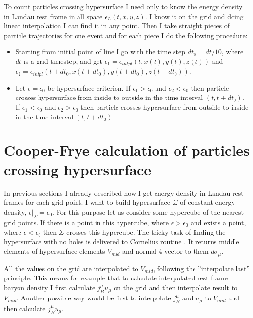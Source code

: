 \documentclass[12pt,a4paper]{report}
\begin{document}
To count particles crossing hypersurface I need only to know the energy density in Landau rest frame in all space $\epsilon_{L}(t,x,y,z)$. I know it on the grid and doing linear interpolation I can find it in any point. Then I take straight pieces of particle trajectories for one event and for each piece I do the following procedure:
\begin{itemize}
\item Starting from initial point of line I go with the time step $dt_0 = dt/10$, where $dt$ is a grid  timestep, and get $\epsilon_1 = \epsilon_{intpl}(t,x(t),y(t),z(t))$ and $\epsilon_2 = \epsilon_{intpl}(t+dt_0,x(t+dt_0),y(t+dt_0),z(t+dt_0))$.
\item Let $\epsilon = \epsilon_0$ be hypersurface criterion. If $\epsilon_1 > \epsilon_0$ and $\epsilon_2 < \epsilon_0$ then particle crosses hypersurface from inside to outside in the time interval $(t,t+dt_0)$. If $\epsilon_1 < \epsilon_0$ and $\epsilon_2 > \epsilon_0$ then particle crosses hypersurface from outside to inside in the time interval $(t,t+dt_0)$.
\end{itemize} 



\section{Cooper-Frye calculation of particles crossing hypersurface}

In previous sections I already described how I get energy density in Landau rest frames for each grid point. I want to build hypersurface $\Sigma$ of constant energy density, $\epsilon|_{\Sigma} = \epsilon_0$. For this purpose let us consider some hypercube of the nearest grid points. If there is a point in this hypercube, where $\epsilon > \epsilon_0$ and exists a point, where $\epsilon < \epsilon_0$ then $\Sigma$ crosses this hypercube. The tricky task of finding the hypersurface with no holes is delivered to Cornelius routine \cite{ref:Cornelius}. It returns middle elements of hypersurface elements $V_{mid}$ and normal 4-vector to them $d\sigma_{\mu}$. 

All the values on the grid are interpolated to $V_{mid}$, following the ''interpolate last'' principle. This means for example that to calculate interpolated rest frame baryon density I first calculate $j_B^{\mu} u_{\mu}$ on the grid and then interpolate result to $V_{mid}$. Another possible way would be first to interpolate $j_B^{\mu}$ and $u_{\mu}$ to $V_{mid}$ and then calculate $j_B^{\mu} u_{\mu}$.
\end{document}
